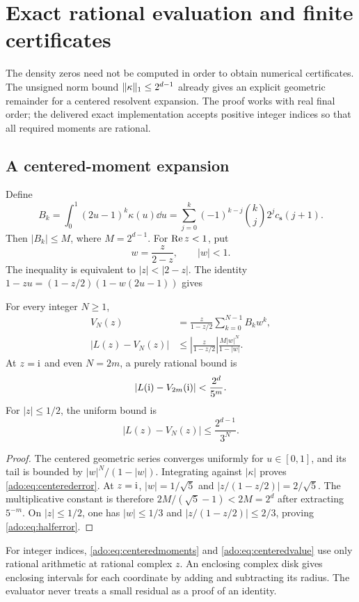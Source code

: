 

\section{Exact rational evaluation and finite certificates}
\label{ado:sec:computation}
The density zeros need not be computed in order to obtain numerical
certificates. The unsigned norm bound $\lVert\kappa\rVert_1\le2^{d-1}$
already gives an explicit geometric remainder for a centered
resolvent expansion. The proof works with real final order; the delivered
exact implementation accepts positive integer indices so that all
required moments are rational.

\subsection{A centered-moment expansion}
Define
\begin{equation}\label{ado:eq:centeredmoments}
 B_k=\int_0^1(2u-1)^k\kappa(u)\dd u
 =\sum_{j=0}^k(-1)^{k-j}\binom{k}{j}2^j c_{\boldsymbol{s}}(j+1).
\end{equation}
Then $|B_k|\le M$, where $M=2^{d-1}$. For $\operatorname{Re} z<1$, put
\[
 w=\frac{z}{2-z},\qquad |w|<1.
\]
The inequality is equivalent to $|z|<|2-z|$. The identity
$1-zu=(1-z/2)(1-w(2u-1))$ gives
\begin{theorem}
\label{ado:thm:evaluator}
For every integer $N\ge1$,
\begin{align}
 V_N(z)&=\frac{z}{1-z/2}\sum_{k=0}^{N-1}B_kw^k,
 \label{ado:eq:centeredvalue}\\
 |L(z)-V_N(z)|
 &\le\left|\frac{z}{1-z/2}\right|
          \frac{M|w|^N}{1-|w|}.
 \label{ado:eq:centerederror}
\end{align}
At $z=\mathrm{i}$ and even $N=2m$, a purely rational bound is
\begin{equation}\label{ado:eq:gaussianerror}
 |L(\mathrm{i})-V_{2m}(\mathrm{i})|<\frac{2^d}{5^m}.
\end{equation}
For $|z|\le1/2$, the uniform bound is
\begin{equation}\label{ado:eq:halferror}
 |L(z)-V_N(z)|\le\frac{2^{d-1}}{3^N}.
\end{equation}
\end{theorem}
\begin{proof}
The centered geometric series converges uniformly for $u\in[0,1]$,
and its tail is bounded by $|w|^N/(1-|w|)$. Integrating against
$|\kappa|$ proves \eqref{ado:eq:centerederror}. At $z=\mathrm{i}$,
$|w|=1/\sqrt5$ and $|z/(1-z/2)|=2/\sqrt5$. The multiplicative
constant is therefore $2M/(\sqrt5-1)<2M=2^d$ after extracting
$5^{-m}$. On $|z|\le1/2$, one has $|w|\le1/3$ and
$|z/(1-z/2)|\le2/3$, proving \eqref{ado:eq:halferror}.
\end{proof}
For integer indices, \eqref{ado:eq:centeredmoments} and
\eqref{ado:eq:centeredvalue} use only rational arithmetic at rational
complex $z$. An enclosing complex disk gives enclosing intervals for
each coordinate by adding and subtracting its radius. The evaluator
never treats a small residual as a proof of an identity.

